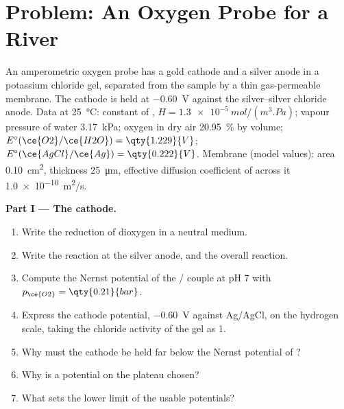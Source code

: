 \section{Problem: An Oxygen Probe for a River}

\begin{problem}
\label{pb:b2:current-potential-curves:1}
An amperometric oxygen probe has a gold cathode and a silver anode in a
potassium chloride gel, separated from the sample by a thin gas-permeable
membrane. The cathode is held at \qty{-0.60}{V} against the silver--silver
chloride anode. Data at \qty{25}{\degreeCelsius}:  constant of
, $H = \qty{1.3e-5}{mol/(m^3.Pa)}$; vapour pressure of water
\qty{3.17}{kPa}; oxygen in dry air 20.95~\% by volume; $E^\circ(\ce{O2}/\ce{H2O}) =
\qty{1.229}{V}$; $E^\circ(\ce{AgCl}/\ce{Ag}) = \qty{0.222}{V}$. Membrane (model
values): area \qty{0.10}{cm^2}, thickness \qty{25}{\micro m}, effective
diffusion coefficient of  across it \qty{1.0e-10}{m^2/s}.

\medskip
\noindent\textbf{Part I --- The cathode.}
\begin{enumerate}
  \item Write the reduction of dioxygen in a neutral medium.
  \item Write the reaction at the silver anode, and the overall reaction.
  \item Compute the Nernst potential of the / couple at pH 7 with
        $p_{\ce{O2}} = \qty{0.21}{bar}$.
  \item Express the cathode potential, \qty{-0.60}{V} against Ag/AgCl, on the
        hydrogen scale, taking the chloride activity of the gel as 1.
  \item Why must the cathode be held far below the Nernst potential of
        ?
  \item Why is a potential on the plateau chosen?
  \item What sets the lower limit of the usable potentials?
\end{enumerate}


\end{problem}

